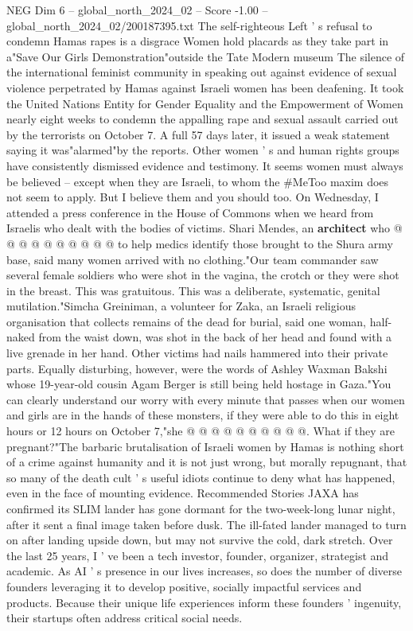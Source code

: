 \begin{textsample}{NEG Dim 6 – global\_north\_2024\_02 – Score -1.00 – global\_north\_2024\_02/200187395.txt}  \label{ex:f6_neg_251}
The self-righteous Left ' s refusal to condemn Hamas rapes is a disgrace Women hold placards as they take part in a"Save Our Girls Demonstration"outside the Tate Modern museum The silence of the international feminist community in speaking out against evidence of sexual violence perpetrated by Hamas against Israeli women has been deafening.
It took the United Nations Entity for Gender Equality and the Empowerment of Women nearly eight weeks to condemn the appalling rape and sexual assault carried out by the terrorists on October 7.
A full 57 days later, it issued a weak statement saying it was"alarmed"by the reports.
Other women ' s and human rights groups have consistently dismissed evidence and testimony.
It seems women must always be believed -- except when they are Israeli, to whom the \#MeToo maxim does not seem to apply.
But I believe them and you should too.
On Wednesday, I attended a press conference in the House of Commons when we heard from Israelis who dealt with the bodies of victims.
Shari Mendes, an \textbf{architect} who @ @ @ @ @ @ @ @ @ @ to help medics identify those brought to the Shura army base, said many women arrived with no clothing."Our team commander saw several female soldiers who were shot in the vagina, the crotch or they were shot in the breast.
This was gratuitous.
This was a deliberate, systematic, genital mutilation."Simcha Greiniman, a volunteer for Zaka, an Israeli religious organisation that collects remains of the dead for burial, said one woman, half-naked from the waist down, was shot in the back of her head and found with a live grenade in her hand.
Other victims had nails hammered into their private parts.
Equally disturbing, however, were the words of Ashley Waxman Bakshi whose 19-year-old cousin Agam Berger is still being held hostage in Gaza."You can clearly understand our worry with every minute that passes when our women and girls are in the hands of these monsters, if they were able to do this in eight hours or 12 hours on October 7,"she @ @ @ @ @ @ @ @ @ @.
What if they are pregnant?"The barbaric brutalisation of Israeli women by Hamas is nothing short of a crime against humanity and it is not just wrong, but morally repugnant, that so many of the death cult ' s useful idiots continue to deny what has happened, even in the face of mounting evidence.
Recommended Stories JAXA has confirmed its SLIM lander has gone dormant for the two-week-long lunar night, after it sent a final image taken before dusk.
The ill-fated lander managed to turn on after landing upside down, but may not survive the cold, dark stretch.
Over the last 25 years, I ' ve been a tech investor, founder, organizer, strategist and academic.
As AI ' s presence in our lives increases, so does the number of diverse founders leveraging it to develop positive, socially impactful services and products.
Because their unique life experiences inform these founders ' ingenuity, their startups often address critical social needs.

\end{textsample}
